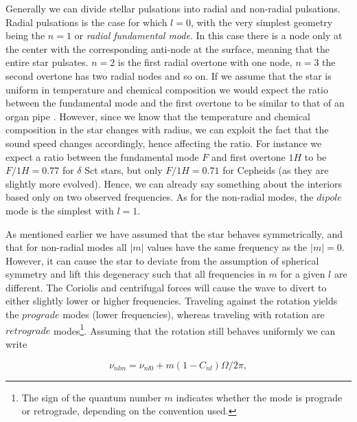 Generally we can divide stellar pulsations into radial and non-radial pulsations. Radial pulsations is the case for which $l=0$, with the very simplest geometry being the $n=1$ or \textit{radial fundamental mode}. In this case there is a node only at the center with the corresponding anti-node at the surface, meaning that the entire star pulsates. $n=2$ is the first radial overtone with one node, $n=3$ the second overtone has two radial nodes and so on. %
If we assume that the star is uniform in temperature and chemical composition we would expect the ratio between the fundamental mode and the first overtone to be similar to that of an organ pipe \citep{aerts2010}. However, since we know that the temperature and chemical composition in the star changes with radius, we can exploit the fact that the sound speed changes accordingly, hence affecting the ratio. For instance we expect a ratio between the fundamental mode $F$ and first overtone $1H$ to be $F/1H = 0.77$ for $\delta$ Sct stars, but only $F/1H=0.71$ for Cepheids (as they are slightly more evolved). Hence, we can already say something about the interiors based only on two observed frequencies. As for the non-radial modes, the $dipole$ mode is the simplest with $l=1$. 

As mentioned earlier we have assumed that the star behaves symmetrically, and that for non-radial modes all $|m|$ values have the same frequency as the $|m|=0$. However, it can cause the star to deviate from the assumption of spherical symmetry and lift this degeneracy such that all frequencies in $m$ for a given $l$ are different. The Coriolis and centrifugal forces will cause the wave to divert to either slightly lower or higher frequencies. Traveling against the rotation yields the $prograde$ modes (lower frequencies), whereas traveling with rotation are $retrograde$ modes\footnote{The sign of the quantum number $m$ indicates whether the mode is prograde or retrograde, depending on the convention used.}. Assuming that the rotation still behaves uniformly we can write 

\begin{equation}
    \nu_{nlm} = \nu_{nl0}+ m(1-C_{nl})\Omega/2\pi,
\end{equation}

